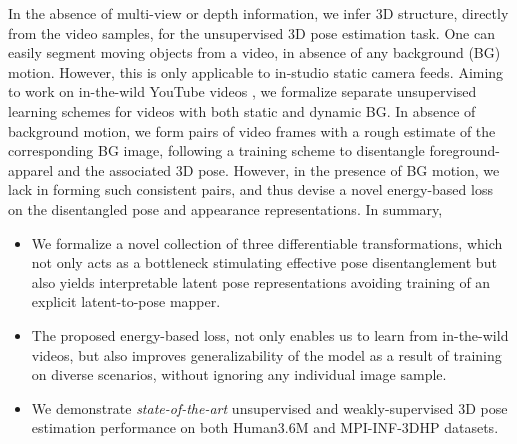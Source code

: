 \documentclass[letterpaper]{article} \usepackage{aaai20}  \usepackage{times}  \usepackage{helvet}  \usepackage{courier}  \usepackage{url}  \usepackage{graphicx}  \usepackage{amsmath}
\begin{document}
In the absence of multi-view or depth information, we infer 3D structure, directly from the video samples, for the unsupervised 3D pose estimation task. 
One can easily segment moving objects from a video, in absence of any background (BG) motion. However, this is only applicable to in-studio static camera feeds. Aiming to work on in-the-wild YouTube videos , we formalize separate unsupervised learning schemes for videos with both static and dynamic BG. In absence of background motion, we form pairs of video frames with a rough estimate of the corresponding BG image, following a training scheme to disentangle foreground-apparel and the associated 3D pose. However, in the presence of BG motion, we lack in forming such consistent pairs, and thus devise a novel energy-based loss on the disentangled pose and appearance representations. In summary,

\begin{itemize}
\item We formalize a novel collection of three differentiable transformations, which not only acts as a bottleneck stimulating effective pose disentanglement but also yields interpretable latent pose representations avoiding training of an explicit latent-to-pose mapper.

\item The proposed energy-based loss, not only enables us to learn from in-the-wild videos, but also improves generalizability of the model as a result of training on diverse scenarios, without ignoring any individual image sample. 



\item We demonstrate \textit{state-of-the-art} unsupervised and weakly-supervised 3D pose estimation performance on both Human3.6M and MPI-INF-3DHP datasets.

\end{itemize}
\end{document}
